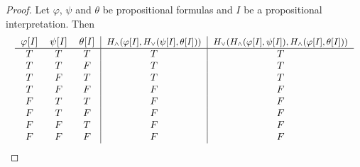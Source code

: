 \begin{proof}
   Let \( \varphi \), \( \psi \) and \( \theta \) be propositional formulas and \( I \) be a propositional interpretation. Then
  \begin{equation*}
    \begin{tabular}{c c c | c | c}
      \( \varphi[I] \) & \( \psi[I] \) & \( \theta[I] \) & \small{\( H_\wedge(\varphi[I], H_\vee(\psi[I], \theta[I])) \)} & \small{\( H_\vee(H_\wedge(\varphi[I], \psi[I]), H_\wedge(\varphi[I], \theta[I])) \)} \\
      \hline
      \( T \)          & \( T \)       & \( T \)         & \( T \)                                                        & \( T \)                                                                              \\
      \( T \)          & \( T \)       & \( F \)         & \( T \)                                                        & \( T \)                                                                              \\
      \( T \)          & \( F \)       & \( T \)         & \( T \)                                                        & \( T \)                                                                              \\
      \( T \)          & \( F \)       & \( F \)         & \( F \)                                                        & \( F \)                                                                              \\
      \( F \)          & \( T \)       & \( T \)         & \( F \)                                                        & \( F \)                                                                              \\
      \( F \)          & \( T \)       & \( F \)         & \( F \)                                                        & \( F \)                                                                              \\
      \( F \)          & \( F \)       & \( T \)         & \( F \)                                                        & \( F \)                                                                              \\
      \( F \)          & \( F \)       & \( F \)         & \( F \)                                                        & \( F \)
    \end{tabular}
  \end{equation*}


\end{proof}
